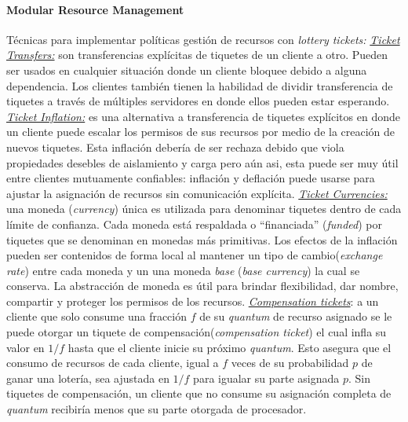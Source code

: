 \paragraph{\textnormal{\textbf{Modular Resource Management}}}
Técnicas para implementar políticas gestión de recursos con \textit{lottery tickets:} \underline{\textit{Ticket Transfers:}} son transferencias explícitas de tiquetes de un cliente a otro. Pueden ser usados en cualquier situación donde un cliente bloquee debido a alguna dependencia. Los clientes también tienen la habilidad de dividir transferencia de tiquetes a través de múltiples servidores en donde ellos pueden estar esperando. \underline{\textit{Ticket Inflation:}} es una alternativa a transferencia de tiquetes explícitos en donde un cliente puede escalar los permisos de sus recursos por medio de la creación de nuevos tiquetes. Esta inflación debería de ser rechaza debido que viola propiedades desebles de aislamiento y carga pero aún asi, esta puede ser muy útil entre clientes mutuamente confiables: inflación y deflación puede usarse para ajustar la asignación de recursos sin comunicación explícita. \underline{\textit{Ticket Currencies:}} una moneda (\textit{currency}) única es utilizada para denominar tiquetes dentro de cada límite de confianza. Cada moneda está respaldada o ``financiada'' (\textit{funded}) por tiquetes que se denominan en monedas más primitivas. Los efectos de la inflación pueden ser contenidos de forma local al mantener un tipo de cambio(\textit{exchange rate}) entre cada moneda y un una moneda \emph{base} (\textit{base currency}) la cual se conserva. La abstracción de moneda es útil para brindar flexibilidad, dar nombre, compartir y proteger los permisos de los recursos. \underline{\textit{Compensation tickets}}: a un cliente que solo consume una fracción $f$ de su \emph{quantum} de recurso asignado se le puede otorgar un tiquete de compensación(\emph{compensation ticket}) el cual infla su valor en $1/f$ hasta que el cliente inicie su próximo \emph{quantum}. Esto asegura que el consumo de recursos de cada cliente, igual a $f$ veces de su probabilidad $p$ de ganar una lotería, sea ajustada en $1/f$ para igualar su parte asignada $p$. Sin tiquetes de compensación, un cliente que no consume su asignación completa de \emph{quantum} recibiría menos que su parte otorgada de procesador.

